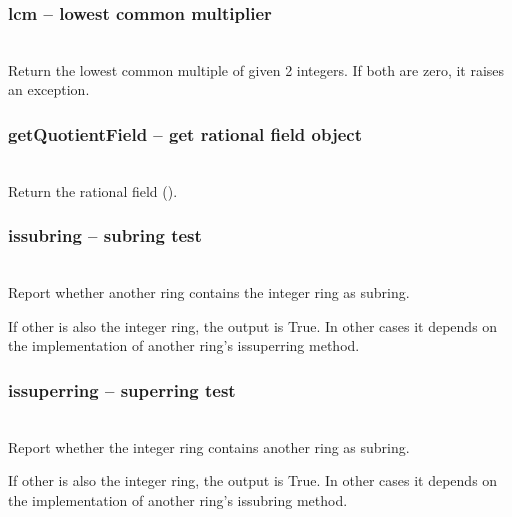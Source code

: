   \subsubsection{lcm -- lowest common multiplier}
   \\
   \spacing
   \quad Return the lowest common multiple of given 2 integers. 
   \quad If both are zero, it raises an exception.\\
%
  \subsubsection{getQuotientField -- get rational field object}
   \\
   \spacing
   \quad Return the rational field ().\\
%
  \subsubsection{issubring -- subring test}
   \\
   \spacing
   \quad Report whether another ring contains the integer ring as subring.

   If other is also the integer ring, the output is True. In other cases it depends on the implementation of another ring's issuperring method.\\
   \spacing
%
  \subsubsection{issuperring -- superring test}
   \\
   \spacing
   \quad Report whether the integer ring contains another ring as subring.

If other is also the integer ring, the output is True. In other cases it depends on the implementation of another ring's issubring method.\\
   \spacing


